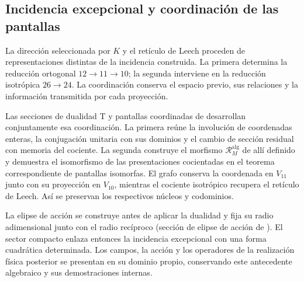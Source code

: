 \subsection{Incidencia excepcional y coordinación de las pantallas}
\label{exc:pantallas-dualidad}

La dirección seleccionada por \(K\) y el retículo de Leech proceden
de representaciones distintas de la incidencia construida. La primera
determina la reducción ortogonal \(12\to11\to10\); la segunda
interviene en la reducción isotrópica \(26\to24\). La coordinación
conserva el espacio previo, sus relaciones y la información transmitida
por cada proyección.

Las secciones de dualidad T y pantallas coordinadas de \cite{hmtX} desarrollan
conjuntamente esa coordinación. La primera reúne la involución de
coordenadas enteras, la conjugación unitaria con sus dominios y el
cambio de sección residual con memoria del cociente. La segunda
construye el morfismo \(\mathcal R_M^{\mathrm{alg}}\) de
allí definido y demuestra el isomorfismo de las presentaciones
cocientadas en el teorema correspondiente de pantallas isomorfas.
El grafo conserva la coordenada en \(V_{11}\) junto con su proyección
en \(V_{10}\), mientras el cociente isotrópico recupera el retículo
de Leech. Así se preservan los respectivos núcleos y codominios.

La elipse de acción se construye antes de aplicar la dualidad y fija
su radio adimensional junto con el radio recíproco
(sección de elipse de acción de \cite{hmtX}). El sector compacto enlaza entonces
la incidencia excepcional con una forma cuadrática determinada. Los
campos, la acción y los operadores de la realización física posterior
se presentan en su dominio propio, conservando este antecedente
algebraico y sus demostraciones internas.
